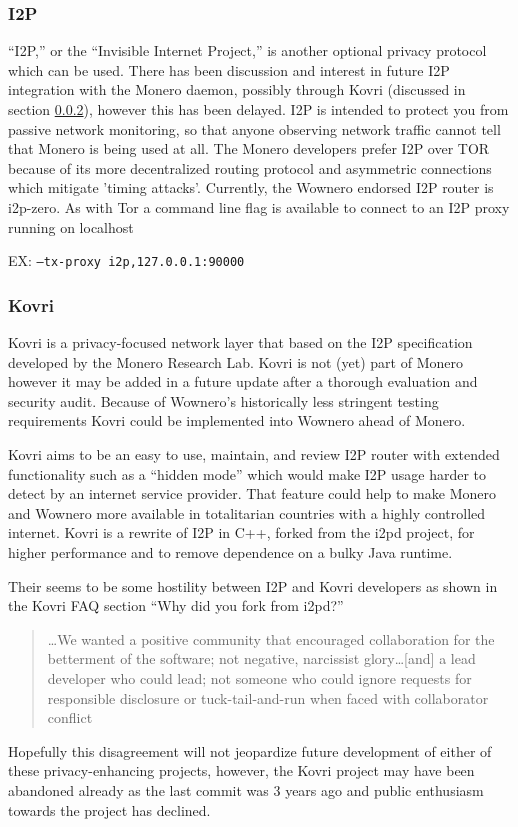 \subsubsection{I2P}
``I2P,'' or the ``Invisible Internet Project,'' is another optional privacy protocol which can be used. There has been discussion and interest in future I2P integration with the Monero daemon, possibly through Kovri (discussed in section \ref{sec:kovri}), however this has been delayed\cite{kovri_repo}. I2P is intended to protect you from passive network monitoring, so that anyone observing network traffic cannot tell that Monero is being used at all. The Monero developers prefer I2P over TOR because of its more decentralized routing protocol and asymmetric connections which mitigate 'timing attacks'\cite{monerohow_privacy}. Currently, the Wownero endorsed I2P router is i2p-zero\cite{i2pzero_repo}. As with Tor a command line flag is available to connect to an I2P proxy running on localhost
\\\centerline{EX: \texttt{--tx-proxy i2p,127.0.0.1:90000}}

\subsubsection{Kovri} \label{sec:kovri}
Kovri is a privacy-focused network layer that based on the I2P specification developed by the Monero Research Lab\cite{kovri_repo}. Kovri is not (yet) part of Monero however it may be added in a future update after a thorough evaluation and security audit\cite{moneropedia}. Because of Wownero's historically less stringent testing requirements Kovri could be implemented into Wownero ahead of Monero.

Kovri aims to be an easy to use, maintain, and review I2P router with extended functionality such as a ``hidden mode'' which would make I2P usage harder to detect by an internet service provider\cite{kovri_repo}. That feature could help to make Monero and Wownero more available in totalitarian countries with a highly controlled internet. Kovri is a rewrite of I2P in C++, forked from the i2pd project, for higher performance and to remove dependence on a bulky Java runtime\cite{kovri_repo}.

Their seems to be some hostility between I2P and Kovri developers as shown in the Kovri FAQ section ``Why did you fork from i2pd?'' \cite{kovri_repo}
\begin{quote}
    \dots We wanted a positive community that encouraged collaboration for the betterment of the software; not negative, narcissist glory\dots [and] a lead developer who could lead; not someone who could ignore requests for responsible disclosure or tuck-tail-and-run when faced with collaborator conflict
\end{quote}
Hopefully this disagreement will not jeopardize future development of either of these privacy-enhancing projects, however, the Kovri project may have been abandoned already as the last commit was 3 years ago and public enthusiasm towards the project has declined. 


